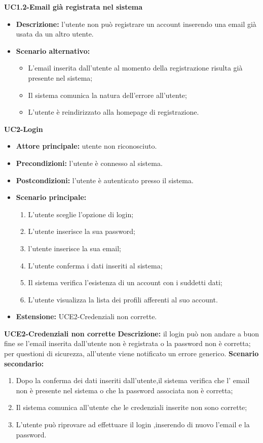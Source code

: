 \textbf{UC1.2-Email già registrata nel sistema}
\begin{itemize}
    \item \textbf{Descrizione: }l'utente non può registrare un account inserendo una email già usata da un altro utente.
    \item \textbf{Scenario alternativo:}
    \begin{itemize}
        \item L'email inserita dall'utente al momento della registrazione risulta già presente nel sistema;
        \item Il sistema comunica la natura dell'errore all'utente;
        \item L'utente è reindirizzato alla homepage di registrazione.
    \end{itemize}
\end{itemize}
\break

\textbf{UC2-Login}
\begin{itemize}
\item \textbf{Attore principale:} utente non riconosciuto.
\item \textbf{Precondizioni:} l'utente è connesso al sistema.
\item \textbf{Postcondizioni:} l'utente è autenticato presso il sistema.
\item \textbf{Scenario principale:}
\begin{enumerate}
    \item L'utente sceglie l'opzione di login;
    \item L'utente inserisce la sua password;
    \item l'utente inserisce la sua email;
    \item L'utente conferma i dati inseriti al sistema;
    \item Il sistema verifica l'esistenza di un account con i suddetti dati;
    \item L'utente visualizza la lista dei profili afferenti al suo account.
\end{enumerate}
    \item \textbf{Estensione: }UCE2-Credenziali non corrette.
\end{itemize}

\textbf{UCE2-Credenziali non corrette}
\textbf{Descrizione: }il login può non andare a buon fine se l'email inserita dall'utente non è registrata 
o la password non è corretta; per questioni di sicurezza, all'utente viene notificato un errore generico.
\textbf{Scenario secondario:}
\begin{enumerate}
    \item Dopo la conferma dei dati inseriti dall'utente,il sistema verifica 
    che l' email non è presente nel sistema o che la password associata non è corretta;
    \item Il sistema comunica all'utente che le credenziali inserite non sono corrette;
    \item L'utente può riprovare ad effettuare il login ,inserendo di nuovo l'email e la password.
\end{enumerate}


